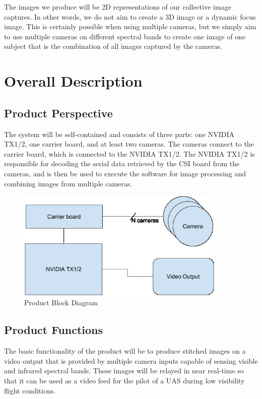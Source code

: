 \documentclass[letterpaper,10pt,serif,draftclsnofoot,onecolumn,compsoc,titlepage]{IEEEtran}
\begin{document}
The images we produce will be 2D representations of our collective image captures. In 
other words, we do not aim to create a 3D image or a dynamic focus image. This is 
certainly possible when using multiple cameras, but we simply aim to use multiple 
cameras on different spectral bands to create one image of one subject that is the 
combination of all images captured by the cameras.\\


\section{Overall Description}

\subsection{Product Perspective}

The system will be self-contained and consists of three parts: one NVIDIA TX1/2, 
one carrier board, and at least two cameras. The cameras connect to the carrier board, 
which is connected to the NVIDIA TX1/2. The NVIDIA TX1/2 is responsible for decoding 
the serial data retrieved by the CSI board from the cameras, and is then be used to 
execute the software for image processing and combining images from multiple cameras.\\

\begin{figure}[H]
	\centering
	\label{fig:ProductBlockDiagram}
	\includegraphics[width=10cm]{images/diagram.eps}
	\caption{Product Block Diagram \label{overflow}}
\end{figure}

\subsection{Product Functions}

The basic functionality of the product will be to produce stitched images on a video 
output that is provided by multiple camera inputs capable of sensing visible and 
infrared spectral bands. These images will be relayed in near real-time so that it 
can be used as a video feed for the pilot of a UAS during low visibility flight 
conditions. \\
\end{document}
